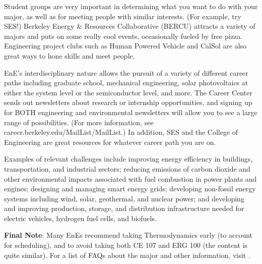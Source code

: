 Student groups are very important in determining what you want to do with your major, as well as for meeting people with similar interests. (For example, try SES!)
Berkeley Energy \& Resources Collaborative (BERCU) attracts a variety of majors and puts on some really cool events, occasionally fueled by free pizza. Engineering project clubs such as Human Powered Vehicle and CalSol are also great ways to hone skills and meet people.
 
EnE’s interdisciplinary nature allows the pursuit of a variety of different career paths including graduate school, mechanical engineering, solar photovoltaics at either the system level or the semiconductor level, and more. The Career Center sends out newsletters about research or internship opportunities, and signing up for BOTH engineering and environmental newsletters will allow you to see a large range of possibilities. (For more information, see {\selectfont career.berkeley.edu/MailList/MailList}.) In addition, SES and the College of Engineering are great resources for whatever career path you are on.
 
Examples of relevant challenges include improving energy efficiency in buildings, transportation, and industrial sectors; reducing emissions of carbon dioxide and other environmental impacts associated with fuel combustion in power plants and engines; designing and managing smart energy grids; developing non-fossil energy systems including wind, solar, geothermal, and nuclear power; and developing and improving production, storage, and distribution infrastructure needed for electric vehicles, hydrogen fuel cells, and biofuels.

\textbf{Final Note}: Many EnEs recommend taking Thermodynamics early (to account for scheduling), and to avoid taking both CE 107 and ERG 100 (the content is quite similar). For a list of FAQs about the major and other information, visit {\selectfont {}}.

